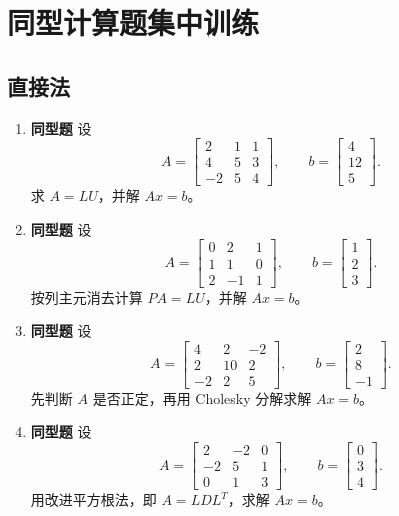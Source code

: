 \documentclass{article}
\newcommand{\simtag}{\textcolor{blue!65!black}{\textbf{同型题}}}
\begin{document}
\newpage

\section{同型计算题集中训练}

\subsection{直接法}

\begin{enumerate}
  \item \simtag{} 设
  \[
    A=\begin{bmatrix}2&1&1\\4&5&3\\-2&5&4\end{bmatrix},\qquad
    b=\begin{bmatrix}4\\12\\5\end{bmatrix}.
  \]
  求 $A=LU$，并解 $Ax=b$。

  \item \simtag{} 设
  \[
    A=\begin{bmatrix}0&2&1\\1&1&0\\2&-1&1\end{bmatrix},\qquad
    b=\begin{bmatrix}1\\2\\3\end{bmatrix}.
  \]
  按列主元消去计算 $PA=LU$，并解 $Ax=b$。

  \item \simtag{} 设
  \[
    A=\begin{bmatrix}4&2&-2\\2&10&2\\-2&2&5\end{bmatrix},\qquad
    b=\begin{bmatrix}2\\8\\-1\end{bmatrix}.
  \]
  先判断 $A$ 是否正定，再用 Cholesky 分解求解 $Ax=b$。

  \item \simtag{} 设
  \[
    A=\begin{bmatrix}2&-2&0\\-2&5&1\\0&1&3\end{bmatrix},\qquad
    b=\begin{bmatrix}0\\3\\4\end{bmatrix}.
  \]
  用改进平方根法，即 $A=LDL^T$，求解 $Ax=b$。


\end{enumerate}
\end{document}
